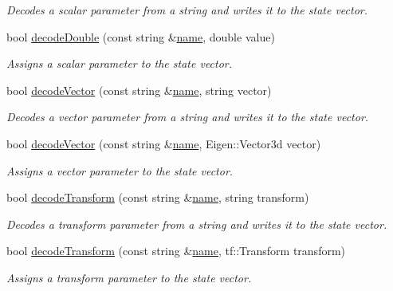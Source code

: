 \begin{DoxyCompactItemize}
\begin{DoxyCompactList}\small\item\em Decodes a scalar parameter from a string and writes it to the state vector. \end{DoxyCompactList}\item 
bool \hyperlink{classGiskardActionServer_a60aebb66785577c5a106de74f6a5c55a}{decode\-Double} (const string \&\hyperlink{classGiskardActionServer_ae1d480bfeed0f97334d25e1dfc868e67}{name}, double value)
\begin{DoxyCompactList}\small\item\em Assigns a scalar parameter to the state vector. \end{DoxyCompactList}\item 
bool \hyperlink{classGiskardActionServer_ae821164a4a9ab651d1243ecace70e7e2}{decode\-Vector} (const string \&\hyperlink{classGiskardActionServer_ae1d480bfeed0f97334d25e1dfc868e67}{name}, string vector)
\begin{DoxyCompactList}\small\item\em Decodes a vector parameter from a string and writes it to the state vector. \end{DoxyCompactList}\item 
bool \hyperlink{classGiskardActionServer_adac7573c728e9e1509b3add22d580ba4}{decode\-Vector} (const string \&\hyperlink{classGiskardActionServer_ae1d480bfeed0f97334d25e1dfc868e67}{name}, Eigen\-::\-Vector3d vector)
\begin{DoxyCompactList}\small\item\em Assigns a vector parameter to the state vector. \end{DoxyCompactList}\item 
bool \hyperlink{classGiskardActionServer_ab1656dc16797cdf15607a42e59435c5b}{decode\-Transform} (const string \&\hyperlink{classGiskardActionServer_ae1d480bfeed0f97334d25e1dfc868e67}{name}, string transform)
\begin{DoxyCompactList}\small\item\em Decodes a transform parameter from a string and writes it to the state vector. \end{DoxyCompactList}\item 
bool \hyperlink{classGiskardActionServer_afd265e6b6c0af3afb6e147b4ee2fe0ff}{decode\-Transform} (const string \&\hyperlink{classGiskardActionServer_ae1d480bfeed0f97334d25e1dfc868e67}{name}, tf\-::\-Transform transform)
\begin{DoxyCompactList}\small\item\em Assigns a transform parameter to the state vector. \end{DoxyCompactList}\end{DoxyCompactItemize}
